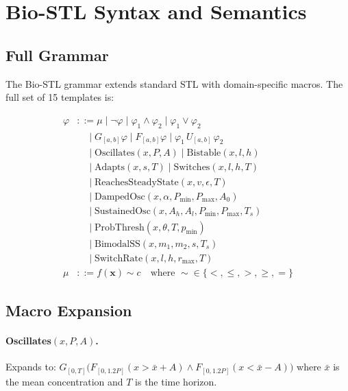 \documentclass[11pt]{article}
\begin{document}
\newpage
\appendix

\section{Bio-STL Syntax and Semantics}
\label{app:biostl}

\subsection{Full Grammar}

The Bio-STL grammar extends standard STL with domain-specific macros.
The full set of 15 templates is:

\begin{align*}
\varphi &::= \mu \mid \neg\varphi \mid \varphi_1 \land \varphi_2
         \mid \varphi_1 \lor \varphi_2 \\
        &\quad\mid G_{[a,b]}\varphi \mid F_{[a,b]}\varphi
         \mid \varphi_1\,U_{[a,b]}\,\varphi_2 \\
        &\quad\mid \text{Oscillates}(x, P, A)
         \mid \text{Bistable}(x, l, h) \\
        &\quad\mid \text{Adapts}(x, s, T)
         \mid \text{Switches}(x, l, h, T) \\
        &\quad\mid \text{ReachesSteadyState}(x, v, \epsilon, T) \\
        &\quad\mid \text{DampedOsc}(x, \alpha, P_{\min}, P_{\max}, A_0) \\
        &\quad\mid \text{SustainedOsc}(x, A_h, A_l, P_{\min}, P_{\max}, T_s) \\
        &\quad\mid \text{ProbThresh}(x, \theta, T, p_{\min}) \\
        &\quad\mid \text{BimodalSS}(x, m_1, m_2, s, T_s) \\
        &\quad\mid \text{SwitchRate}(x, l, h, r_{\max}, T) \\
\mu &::= f(\mathbf{x}) \sim c \quad\text{where } {\sim} \in \{<, \leq, >, \geq, =\}
\end{align*}

\subsection{Macro Expansion}

\paragraph{Oscillates$(x, P, A)$.}
Expands to: $G_{[0,T]}\big(F_{[0,1.2P]}(x > \bar{x} + A) \land
F_{[0,1.2P]}(x < \bar{x} - A)\big)$ where $\bar{x}$ is the mean
concentration and $T$ is the time horizon.
\end{document}
